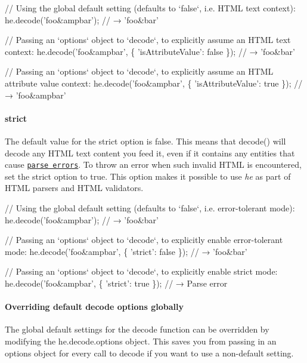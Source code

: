 \begin{DoxyCode}
// Using the global default setting (defaults to `false`, i.e. HTML text context):
he.decode('foo&ampbar');
// → 'foo&bar'

// Passing an `options` object to `decode`, to explicitly assume an HTML text context:
he.decode('foo&ampbar', \{
  'isAttributeValue': false
\});
// → 'foo&bar'

// Passing an `options` object to `decode`, to explicitly assume an HTML attribute value context:
he.decode('foo&ampbar', \{
  'isAttributeValue': true
\});
// → 'foo&ampbar'
\end{DoxyCode}


\paragraph*{{\ttfamily strict}}

The default value for the {\ttfamily strict} option is {\ttfamily false}. This means that {\ttfamily decode()} will decode any H\+T\+ML text content you feed it, even if it contains any entities that cause \href{https://html.spec.whatwg.org/multipage/syntax.html#tokenizing-character-references}{\tt parse errors}. To throw an error when such invalid H\+T\+ML is encountered, set the {\ttfamily strict} option to {\ttfamily true}. This option makes it possible to use {\itshape he} as part of H\+T\+ML parsers and H\+T\+ML validators.


\begin{DoxyCode}
// Using the global default setting (defaults to `false`, i.e. error-tolerant mode):
he.decode('foo&ampbar');
// → 'foo&bar'

// Passing an `options` object to `decode`, to explicitly enable error-tolerant mode:
he.decode('foo&ampbar', \{
  'strict': false
\});
// → 'foo&bar'

// Passing an `options` object to `decode`, to explicitly enable strict mode:
he.decode('foo&ampbar', \{
  'strict': true
\});
// → Parse error
\end{DoxyCode}


\paragraph*{Overriding default {\ttfamily decode} options globally}

The global default settings for the {\ttfamily decode} function can be overridden by modifying the {\ttfamily he.\+decode.\+options} object. This saves you from passing in an {\ttfamily options} object for every call to {\ttfamily decode} if you want to use a non-\/default setting.


